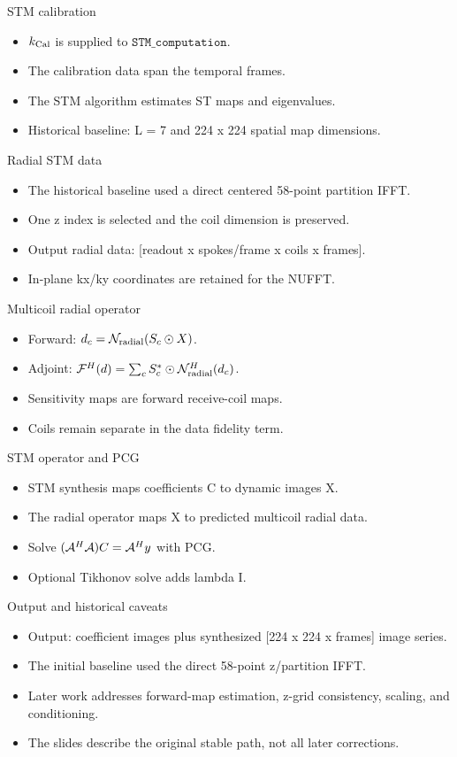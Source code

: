 \documentclass[aspectratio=169,professionalfonts]{beamer}
\begin{document}
\begin{frame}{STM calibration}
\begin{itemize}
\item $k_{\rm Cal}$ is supplied to $\texttt{STM\_computation}$.
\item The calibration data span the temporal frames.
\item The STM algorithm estimates ST maps and eigenvalues.
\item Historical baseline: L = 7 and 224 x 224 spatial map dimensions.
\end{itemize}
\end{frame}
\begin{frame}{Radial STM data}
\begin{itemize}
\item The historical baseline used a direct centered 58-point partition IFFT.
\item One z index is selected and the coil dimension is preserved.
\item Output radial data: [readout x spokes/frame x coils x frames].
\item In-plane kx/ky coordinates are retained for the NUFFT.
\end{itemize}
\end{frame}
\begin{frame}{Multicoil radial operator}
\begin{itemize}
\item Forward: $d_c={\cal N}_{\rm radial}(S_c \odot X)$.
\item Adjoint: ${\cal F}^H(d)=\sum_c S_c^* \odot {\cal N}_{\rm radial}^H(d_c)$.
\item Sensitivity maps are forward receive-coil maps.
\item Coils remain separate in the data fidelity term.
\end{itemize}
\end{frame}
\begin{frame}{STM operator and PCG}
\begin{itemize}
\item STM synthesis maps coefficients C to dynamic images X.
\item The radial operator maps X to predicted multicoil radial data.
\item Solve $({\cal A}^H{\cal A})C={\cal A}^H y$ with PCG.
\item Optional Tikhonov solve adds lambda I.
\end{itemize}
\end{frame}
\begin{frame}{Output and historical caveats}
\begin{itemize}
\item Output: coefficient images plus synthesized [224 x 224 x frames] image series.
\item The initial baseline used the direct 58-point z/partition IFFT.
\item Later work addresses forward-map estimation, z-grid consistency, scaling, and conditioning.
\item The slides describe the original stable path, not all later corrections.
\end{itemize}
\end{frame}
\end{document}
